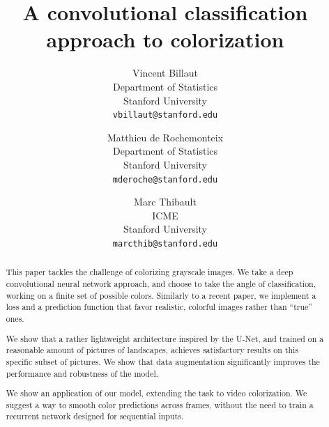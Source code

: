 \documentclass[10pt,twocolumn,letterpaper]{article}
\begin{document}
\title{A convolutional classification approach to colorization}

\author{Vincent Billaut\\
Department of Statistics\\
Stanford University\\
{\tt\small vbillaut@stanford.edu}
\and
Matthieu de Rochemonteix\\
Department of Statistics\\
Stanford University\\
{\tt\small mderoche@stanford.edu}
\and
Marc Thibault\\
ICME\\
Stanford University\\
{\tt\small marcthib@stanford.edu}
}

\maketitle



\begin{abstract}
This paper tackles the challenge of colorizing grayscale images. We take a deep convolutional neural network approach, and choose to take the angle of classification, working on a finite set of possible colors. Similarly to a recent paper, we implement a loss and a prediction function that favor realistic, colorful images rather than ``true'' ones.

We show that a rather lightweight architecture inspired by the U-Net, and trained on a reasonable amount of pictures of landscapes, achieves satisfactory results on this specific subset of pictures. We show that data augmentation significantly improves the performance and robustness of the model. 

We show an application of our model, extending the task to video colorization. We suggest a way to smooth color predictions across frames, without the need to train a recurrent network designed for sequential inputs.

\end{abstract}
\end{document}
